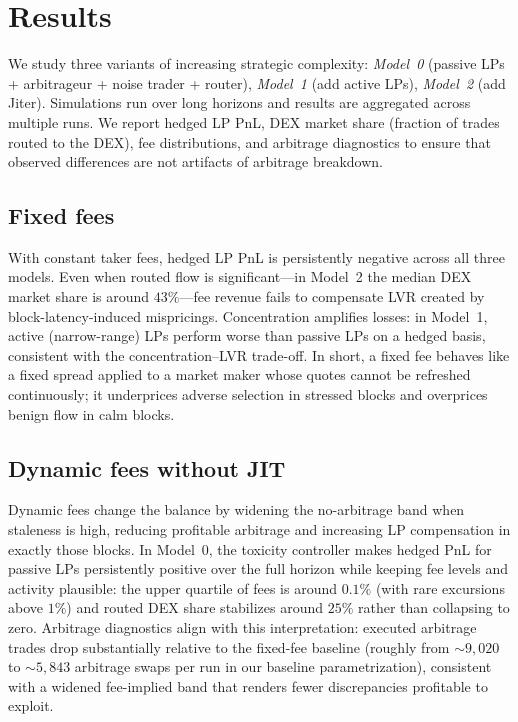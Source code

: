 \documentclass[11pt]{article}
\begin{document}
\section{Results}
We study three variants of increasing strategic complexity:
\emph{Model~0} (passive LPs + arbitrageur + noise trader + router),
\emph{Model~1} (add active LPs),
\emph{Model~2} (add Jiter).
Simulations run over long horizons and results are aggregated across multiple runs. We report hedged LP PnL, DEX market 
share (fraction of trades routed to the DEX), fee distributions, and arbitrage diagnostics to ensure that observed 
differences are not artifacts of arbitrage breakdown.

\subsection*{Fixed fees}
With constant taker fees, hedged LP PnL is persistently negative across all three models. Even when routed flow is 
significant---in Model~2 the median DEX market share is around $43\%$---fee revenue fails to compensate LVR created by 
block-latency-induced mispricings. Concentration amplifies losses: in Model~1, active (narrow-range) LPs perform worse 
than passive LPs on a hedged basis, consistent with the concentration--LVR trade-off. In short, a fixed fee behaves like 
a fixed spread applied to a market maker whose quotes cannot be refreshed continuously; it underprices adverse selection
 in stressed blocks and overprices benign flow in calm blocks.

\subsection*{Dynamic fees without JIT}
Dynamic fees change the balance by widening the no-arbitrage band when staleness is high, reducing profitable 
arbitrage and increasing LP compensation in exactly those blocks.
In Model~0, the toxicity controller makes hedged PnL for passive LPs persistently positive over the full horizon 
while keeping fee levels and activity plausible: the upper quartile of fees is around $0.1\%$ (with rare excursions 
above $1\%$) and routed DEX share stabilizes around $25\%$ rather than collapsing to zero. Arbitrage diagnostics align 
with this interpretation: executed arbitrage trades drop substantially relative to the fixed-fee baseline (roughly from 
$\sim 9{,}020$ to $\sim 5{,}843$ arbitrage swaps per run in our baseline parametrization), consistent with a widened 
fee-implied band that renders fewer discrepancies profitable to exploit.
\end{document}
